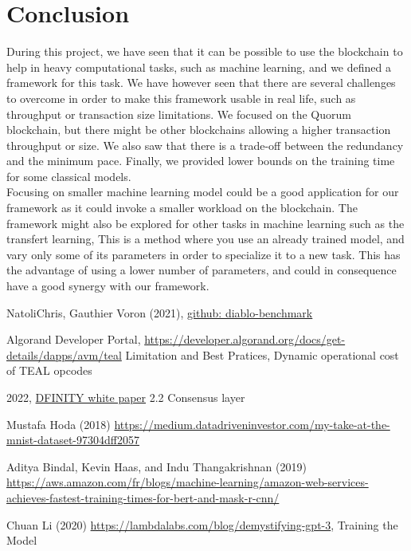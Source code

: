 \documentclass{article}
\begin{document}
\section{Conclusion}
During this project, we have seen that it can be possible to use the blockchain to help in heavy computational tasks, such as
machine learning, and we defined a framework for this task.
We have however seen that there are several challenges to overcome in order to make this framework usable in real life, such as
throughput or transaction size limitations. We focused on the Quorum blockchain, but there might be other blockchains allowing a higher transaction throughput or size.
We also saw that there is a trade-off between the redundancy and the minimum pace. Finally, we provided lower bounds
on the training time for some classical models.\\
Focusing on smaller machine learning model could be a good application for our framework as it could invoke a smaller workload
on the blockchain. The framework might also be explored for other tasks in machine learning such as the transfert learning, This is a method where
you use an already trained model, and vary only some of its parameters in order to specialize it to a new task. This has the
advantage of using a lower number of parameters, and could in consequence have a good synergy with our framework.\\


\newpage
\begin{thebibliography}{9}

    NatoliChris, Gauthier Voron (2021), \href{https://github.com/NatoliChris/diablo-benchmark/tree/develop}{github: diablo-benchmark}

    Algorand Developer Portal, \href{https://developer.algorand.org/docs/get-details/dapps/avm/teal}{https://developer.algorand.org/docs/get-details/dapps/avm/teal} Limitation and Best Pratices, Dynamic operational cost of TEAL opcodes

    2022, \href{https://internetcomputer.org/whitepaper.pdf}{DFINITY white paper} 2.2 Consensus layer

    Mustafa Hoda (2018) \href{https://medium.datadriveninvestor.com/my-take-at-the-mnist-dataset-97304dff2057}{https://medium.datadriveninvestor.com/my-take-at-the-mnist-dataset-97304dff2057}

    Aditya Bindal, Kevin Haas, and Indu Thangakrishnan (2019) \href{https://aws.amazon.com/fr/blogs/machine-learning/amazon-web-services-achieves-fastest-training-times-for-bert-and-mask-r-cnn/}{https://aws.amazon.com/fr/blogs/machine-learning/amazon-web-services-achieves-fastest-training-times-for-bert-and-mask-r-cnn/}

    Chuan Li (2020) \href{https://lambdalabs.com/blog/demystifying-gpt-3}{https://lambdalabs.com/blog/demystifying-gpt-3}, Training the Model

\end{thebibliography}
\end{document}
